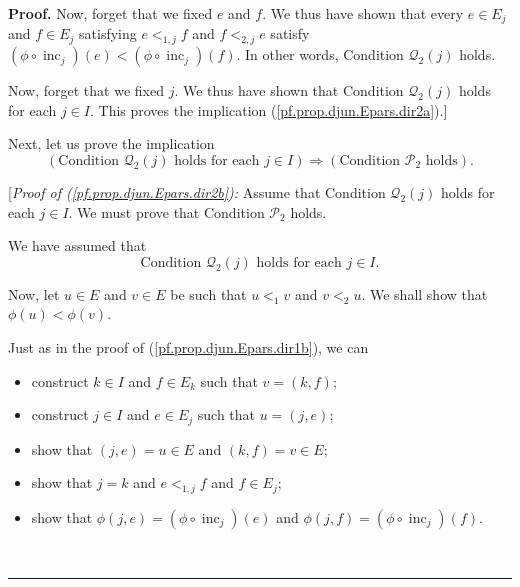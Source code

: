 \documentclass[numbers=enddot,12pt,final,onecolumn,notitlepage,abstracton]{scrartcl}
\theoremstyle{definition}
\newenvironment{proof}[1][Proof]{\noindent\textbf{#1.} }{\ \rule{0.5em}{0.5em}}
\newenvironment{verlong}{}{}
\begin{document}
\begin{verlong}
\begin{footnotesize}
\begin{proof}
Now, forget that we fixed $e$ and $f$. We thus have shown that every $e\in
E_{j}$ and $f\in E_{j}$ satisfying $e<_{1,j}f$ and $f<_{2,j}e$ satisfy
$\left(  \phi\circ\operatorname*{inc}\nolimits_{j}\right)  \left(  e\right)
<\left(  \phi\circ\operatorname*{inc}\nolimits_{j}\right)  \left(  f\right)
$. In other words, Condition $\mathcal{Q}_{2}\left(  j\right)  $ holds.

Now, forget that we fixed $j$. We thus have shown that Condition
$\mathcal{Q}_{2}\left(  j\right)  $ holds for each $j\in I$. This proves the
implication (\ref{pf.prop.djun.Epars.dir2a}).]

Next, let us prove the implication%
\begin{equation}
\left(  \text{Condition }\mathcal{Q}_{2}\left(  j\right)  \text{ holds for
each }j\in I\right)  \Longrightarrow\left(  \text{Condition }\mathcal{P}%
_{2}\text{ holds}\right)  . \label{pf.prop.djun.Epars.dir2b}%
\end{equation}


[\textit{Proof of (\ref{pf.prop.djun.Epars.dir2b}):} Assume that Condition
$\mathcal{Q}_{2}\left(  j\right)  $ holds for each $j\in I$. We must prove
that Condition $\mathcal{P}_{2}$ holds.

We have assumed that%
\begin{equation}
\text{Condition }\mathcal{Q}_{2}\left(  j\right)  \text{ holds for each }j\in
I\text{.} \label{pf.prop.djun.Epars.dir2b.pf.1}%
\end{equation}


Now, let $u\in E$ and $v\in E$ be such that $u<_{1}v$ and $v<_{2}u$. We shall
show that $\phi\left(  u\right)  <\phi\left(  v\right)  $.

Just as in the proof of (\ref{pf.prop.djun.Epars.dir1b}), we can

\begin{itemize}
\item construct $k\in I$ and $f\in E_{k}$ such that $v=\left(  k,f\right)  $;

\item construct $j\in I$ and $e\in E_{j}$ such that $u=\left(  j,e\right)  $;

\item show that $\left(  j,e\right)  =u\in E$ and $\left(  k,f\right)  =v\in
E$;

\item show that $j=k$ and $e<_{1,j}f$ and $f\in E_{j}$;

\item show that $\phi\left(  j,e\right)  =\left(  \phi\circ\operatorname*{inc}%
\nolimits_{j}\right)  \left(  e\right)  $ and $\phi\left(  j,f\right)
=\left(  \phi\circ\operatorname*{inc}\nolimits_{j}\right)  \left(  f\right)  $.
\end{itemize}


\end{proof}
\end{footnotesize}
\end{verlong}
\end{document}
